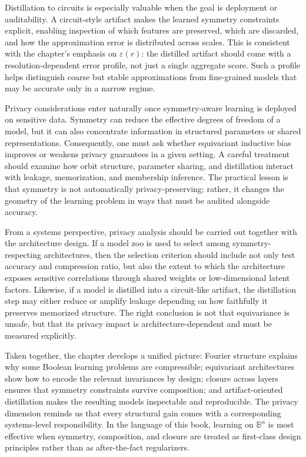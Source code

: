 Distillation to circuits is especially valuable when the goal is deployment or auditability. A circuit-style artifact makes the learned symmetry constraints explicit, enabling inspection of which features are preserved, which are discarded, and how the approximation error is distributed across scales. This is consistent with the chapter's emphasis on \(\varepsilon(r)\): the distilled artifact should come with a resolution-dependent error profile, not just a single aggregate score. Such a profile helps distinguish coarse but stable approximations from fine-grained models that may be accurate only in a narrow regime.

Privacy considerations enter naturally once symmetry-aware learning is deployed on sensitive data. Symmetry can reduce the effective degrees of freedom of a model, but it can also concentrate information in structured parameters or shared representations. Consequently, one must ask whether equivariant inductive bias improves or weakens privacy guarantees in a given setting. A careful treatment should examine how orbit structure, parameter sharing, and distillation interact with leakage, memorization, and membership inference. The practical lesson is that symmetry is not automatically privacy-preserving; rather, it changes the geometry of the learning problem in ways that must be audited alongside accuracy.

From a systems perspective, privacy analysis should be carried out together with the architecture design. If a model zoo is used to select among symmetry-respecting architectures, then the selection criterion should include not only test accuracy and compression ratio, but also the extent to which the architecture exposes sensitive correlations through shared weights or low-dimensional latent factors. Likewise, if a model is distilled into a circuit-like artifact, the distillation step may either reduce or amplify leakage depending on how faithfully it preserves memorized structure. The right conclusion is not that equivariance is unsafe, but that its privacy impact is architecture-dependent and must be measured explicitly.

Taken together, the chapter develops a unified picture: Fourier structure explains why some Boolean learning problems are compressible; equivariant architectures show how to encode the relevant invariances by design; closure across layers ensures that symmetry constraints survive composition; and artifact-oriented distillation makes the resulting models inspectable and reproducible. The privacy dimension reminds us that every structural gain comes with a corresponding systems-level responsibility. In the language of this book, learning on \(\mathbb{B}^n\) is most effective when symmetry, composition, and closure are treated as first-class design principles rather than as after-the-fact regularizers.

